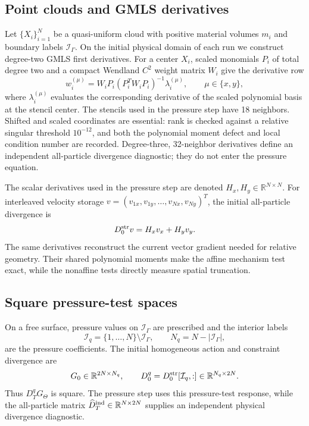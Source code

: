 \documentclass[11pt]{article}
\theoremstyle{plain}
\theoremstyle{definition}
\theoremstyle{remark}
\newcommand{\R}{\mathbb{R}}
\newcommand{\Th}{\Theta}
\begin{document}
\subsection{Point clouds and GMLS derivatives}

Let $\{X_i\}_{i=1}^N$ be a quasi-uniform cloud with positive material volumes
$m_i$ and boundary labels $\mathcal I_\Gamma$.  On the initial physical domain
of each run we construct degree-two GMLS first derivatives.  For a center
$X_i$, scaled monomials $P_i$ of total degree two and a compact Wendland
$C^2$ weight matrix $W_i$ give the derivative row
\begin{equation}
  w_i^{(\mu)}=W_iP_i(P_i^TW_iP_i)^{-1}\lambda_i^{(\mu)},
  \qquad \mu\in\{x,y\},
  \label{eq:gmls_row}
\end{equation}
where $\lambda_i^{(\mu)}$ evaluates the corresponding derivative of the
scaled polynomial basis at the stencil center.  The stencils used in the
pressure step have
18 neighbors.  Shifted and scaled coordinates are essential: rank is checked
against a relative singular threshold $10^{-12}$, and both the polynomial
moment defect and local condition number are recorded.  Degree-three,
32-neighbor derivatives define an independent all-particle divergence
diagnostic; they do not enter the pressure equation.

The scalar derivatives used in the pressure step are denoted
$H_x,H_y\in\R^{N\times N}$.
For interleaved velocity storage
$v=(v_{1x},v_{1y},\ldots,v_{Nx},v_{Ny})^T$, the initial all-particle
divergence is
\begin{equation}
  D_0^{\rm str}v=H_xv_x+H_yv_y.
  \label{eq:initial_strong_matrix}
\end{equation}
The same derivatives reconstruct the current vector gradient needed for
relative geometry.  Their shared polynomial moments make the affine mechanism
test exact, while the nonaffine tests directly measure spatial truncation.

\subsection{Square pressure-test spaces}

On a free surface, pressure values on $\mathcal I_\Gamma$ are prescribed and
the interior labels
\begin{equation}
  \mathcal I_q=\{1,\ldots,N\}\setminus\mathcal I_\Gamma,
  \qquad N_q=N-|\mathcal I_\Gamma|,
  \label{eq:interior_pressure_labels}
\end{equation}
are the pressure coefficients.  The initial homogeneous action and constraint
divergence are
\begin{equation}
  G_0\in\R^{2N\times N_q},
  \qquad
  D_0^q=D_0^{\rm str}[\mathcal I_q,:]
  \in\R^{N_q\times2N}.
  \label{eq:initial_square_pair}
\end{equation}
Thus $D_T^qG_\Th$ is square.  The pressure step uses this pressure-test
response, while the all-particle matrix
$\widehat D_T^{\rm ind}\in\R^{N\times2N}$ supplies an independent physical
divergence diagnostic.
\end{document}
